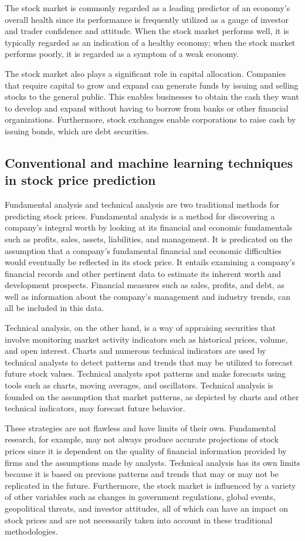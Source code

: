\documentclass[a4paper]{article}
\begin{document}
The stock market is commonly regarded as a leading predictor of an economy's overall health since its performance is frequently utilized as a gauge of investor and trader confidence and attitude. When the stock market performs well, it is typically regarded as an indication of a healthy economy; when the stock market performs poorly, it is regarded as a symptom of a weak economy.

The stock market also plays a significant role in capital allocation. Companies that require capital to grow and expand can generate funds by issuing and selling stocks to the general public. This enables businesses to obtain the cash they want to develop and expand without having to borrow from banks or other financial organizations. Furthermore, stock exchanges enable corporations to raise cash by issuing bonds, which are debt securities.
\subsection{Conventional and machine learning techniques in stock price prediction}
Fundamental analysis and technical analysis are two traditional methods for predicting stock prices. Fundamental analysis is a method for discovering a company's integral worth by looking at its financial and economic fundamentals such as profits, sales, assets, liabilities, and management. It is predicated on the assumption that a company's fundamental financial and economic difficulties would eventually be reflected in its stock price. It entails examining a company's financial records and other pertinent data to estimate its inherent worth and development prospects. Financial measures such as sales, profits, and debt, as well as information about the company's management and industry trends, can all be included in this data.

Technical analysis, on the other hand, is a way of appraising securities that involve monitoring market activity indicators such as historical prices, volume, and open interest. Charts and numerous technical indicators are used by technical analysts to detect patterns and trends that may be utilized to forecast future stock values. Technical analysts spot patterns and make forecasts using tools such as charts, moving averages, and oscillators. Technical analysis is founded on the assumption that market patterns, as depicted by charts and other technical indicators, may forecast future behavior.

These strategies are not flawless and have limits of their own. Fundamental research, for example, may not always produce accurate projections of stock prices since it is dependent on the quality of financial information provided by firms and the assumptions made by analysts. Technical analysis has its own limits because it is based on previous patterns and trends that may or may not be replicated in the future. Furthermore, the stock market is influenced by a variety of other variables such as changes in government regulations, global events, geopolitical threats, and investor attitudes, all of which can have an impact on stock prices and are not necessarily taken into account in these traditional methodologies.
\end{document}

